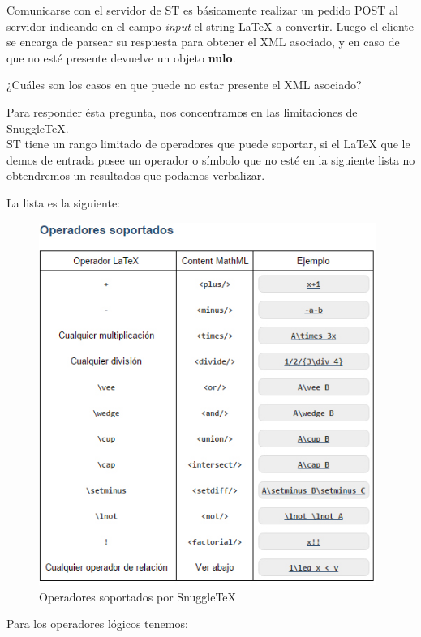 Comunicarse con el servidor de ST es básicamente realizar un pedido POST al servidor indicando en el campo \textit{input} el string LaTeX a convertir. Luego el cliente se encarga de parsear su respuesta para obtener el XML asociado, y en caso de que no esté presente devuelve un objeto \textbf{nulo}.

¿Cuáles son los casos en que puede no estar presente el XML asociado?

Para responder ésta pregunta, nos concentramos en las limitaciones de SnuggleTeX. \\
ST tiene un rango limitado de operadores que puede soportar, si el LaTeX que le demos de entrada posee un operador o símbolo que no esté en la siguiente lista no obtendremos un resultados que podamos verbalizar.

La lista es la siguiente:

\begin{figure}[H]
\centering
	\includegraphics[width=11cm, height=11.84cm]{Figures/opsoportados}
	\caption[]{Operadores soportados por SnuggleTeX}
\label{fig:opsoportados}
\end{figure}

Para los operadores lógicos tenemos:

